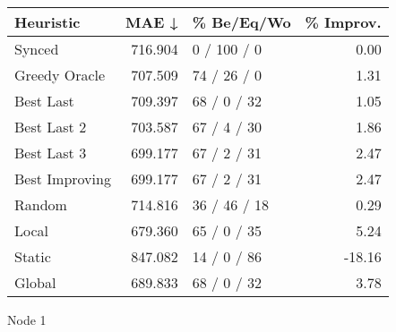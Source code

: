 \begin{tabular}{lrlr}
\toprule
\textbf{Heuristic} & \textbf{MAE ↓} & \textbf{\% Be/Eq/Wo} & \textbf{\% Improv.} \\
\midrule
            Synced &        716.904 &          0 / 100 / 0 &                0.00 \\
     Greedy Oracle &        707.509 &          74 / 26 / 0 &                1.31 \\
         Best Last &        709.397 &          68 / 0 / 32 &                1.05 \\
       Best Last 2 &        703.587 &          67 / 4 / 30 &                1.86 \\
       Best Last 3 &        699.177 &          67 / 2 / 31 &                2.47 \\
    Best Improving &        699.177 &          67 / 2 / 31 &                2.47 \\
            Random &        714.816 &         36 / 46 / 18 &                0.29 \\
             Local &        679.360 &          65 / 0 / 35 &                5.24 \\
            Static &        847.082 &          14 / 0 / 86 &              -18.16 \\
            Global &        689.833 &          68 / 0 / 32 &                3.78 \\
\bottomrule
\end{tabular}
\caption{Node 1}
\label{tab:non_lr05_le1_bs4_1}
